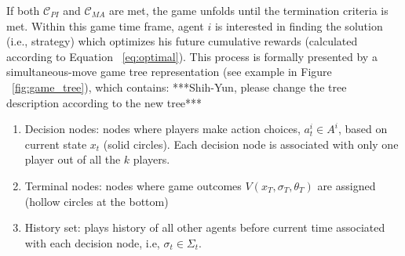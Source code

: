 \documentclass[letterpaper, 10 pt, conference]{ieeeconf}  %
\begin{document}
If both $\mathcal{C}_{PI}$ and $\mathcal{C}_{MA}$ are met, the game unfolds 
until the termination criteria is met. Within this game 
time frame, agent $i$ is interested in finding the solution (i.e., strategy) 
which optimizes his future cumulative rewards (calculated according to Equation 
~\ref{eq:optimal}). This process is formally presented by a
simultaneous-move game tree representation (see example in Figure 
~\ref{fig:game_tree}), which contains:
***Shih-Yun, please change the tree description according to the new tree***
\begin{enumerate}
  \item Decision nodes: nodes where players make action choices, 
    $a^i_t \in A^i$, based on current state $x_t$ (solid circles). Each decision node is associated with only one player out of all the $k$ players.
  \item Terminal nodes: nodes where game outcomes 
    $V(x_T,\sigma_T,\theta_T)$ are assigned (hollow circles at the bottom)
  \item History set: plays history of all other agents before current time associated with each decision node, i.e,  $\sigma_t \in \Sigma_t$. 
\end{enumerate}
\end{document}
